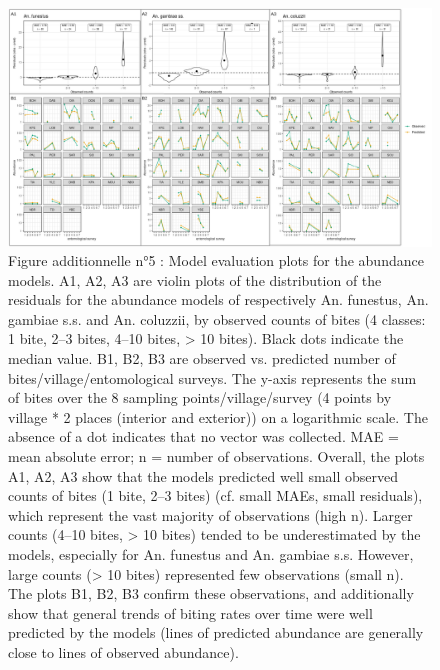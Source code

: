 \documentclass[12pt,twoside]{reedthesis}
\begin{document}
\begin{figure}

{\centering \includegraphics[width=1\linewidth]{figure/add_file_5} 

}

\caption[Article n°1 - Figure additionnelle n°5]{Figure additionnelle n°5 : Model evaluation plots for the abundance models. A1, A2, A3 are violin plots of the distribution of the residuals for the abundance models of respectively An. funestus, An. gambiae s.s. and An. coluzzii, by observed counts of bites (4 classes: 1 bite, 2–3 bites, 4–10 bites, > 10 bites). Black dots indicate the median value. B1, B2, B3 are observed vs. predicted number of bites/village/entomological surveys. The y-axis represents the sum of bites over the 8 sampling points/village/survey (4 points by village * 2 places (interior and exterior)) on a logarithmic scale. The absence of a dot indicates that no vector was collected. MAE = mean absolute error; n = number of observations. Overall, the plots A1, A2, A3 show that the models predicted well small observed counts of bites (1 bite, 2–3 bites) (cf. small MAEs, small residuals), which represent the vast majority of observations (high n). Larger counts (4–10 bites, > 10 bites) tended to be underestimated by the models, especially for An. funestus and An. gambiae s.s. However, large counts (> 10 bites) represented few observations (small n). The plots B1, B2, B3 confirm these observations, and additionally show that general trends of biting rates over time were well predicted by the models (lines of predicted abundance are generally close to lines of observed abundance).}\label{fig:add-file-5}
\end{figure}
\pagebreak
\end{document}
